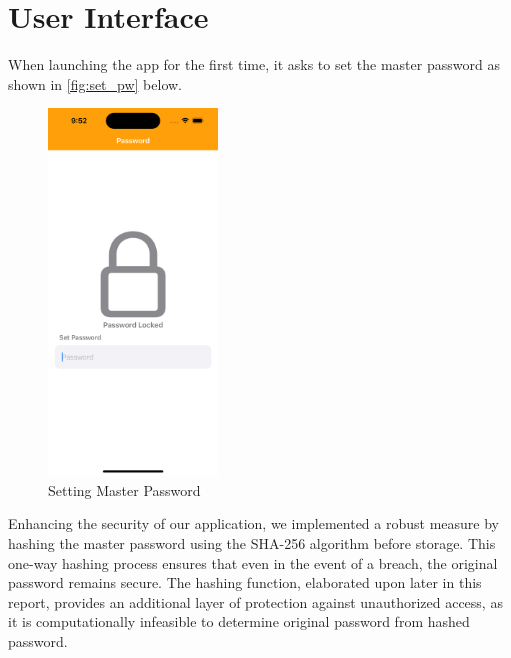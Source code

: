 \documentclass[10pt, titlepage]{article}
\begin{document}
\section*{User Interface}
When launching the app for the first time, it asks to set the master password as shown in \autoref{fig:set_pw} below. 
\begin{figure}[H]
	\centering
	\vspace{-0.25em}
	\includegraphics[width=0.4\textwidth]{img/set_pw}
	\vspace{-0.75em}
	\caption{Setting Master Password}
	\label{fig:set_pw}
	\vspace{-0.75em}
\end{figure}

Enhancing the security of our application, we implemented a robust measure by hashing the master password using the SHA-256 algorithm before storage. This one-way hashing process ensures that even in the event of a breach, the original password remains secure. The hashing function, elaborated upon later in this report, provides an additional layer of protection against unauthorized access, as it is computationally infeasible to determine original password from hashed password.
\end{document}
